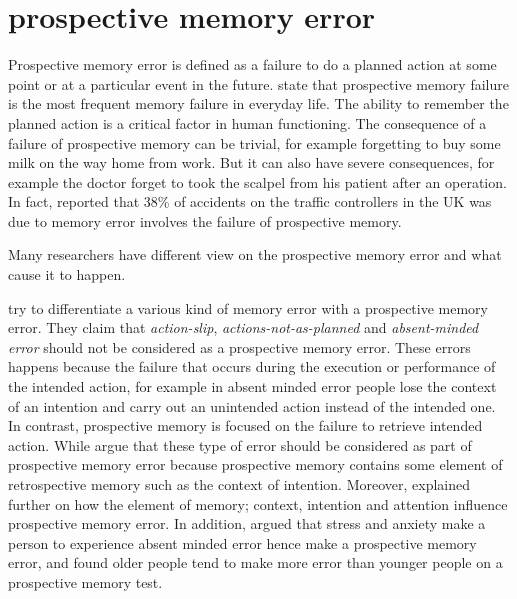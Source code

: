\section{prospective memory error}

Prospective memory error is defined as a failure to do a planned action at some point or at a particular event in the future.
\cite{Kliegel1984} state that prospective memory failure is the most frequent memory failure in everyday life.
The ability to remember the planned action is a critical factor in human functioning. The consequence of a failure of prospective memory can be trivial, for example forgetting to buy some milk on the way home from work.
But it can also have severe consequences, for example the doctor forget to took the scalpel from his patient after an operation.
In fact, \cite{Shorrock2005} reported that 38\% of accidents on the traffic controllers in the UK was due to memory error involves the failure of prospective memory.

Many researchers have different view on the prospective memory error and what cause it to happen.

\cite{LiaKvavilashviliAndJudiEllis} try to differentiate a various kind of memory error with a prospective memory error. They claim that \textit{action-slip}\citep{HeckhausenHeinz1990IAaA},
 \textit{actions-not-as-planned} \citep{Reason1979-REAANA-2} and \textit{absent-minded error} \citep{cohen2008memory} should not be considered as a prospective memory error. These errors happens because the failure that occurs during the execution or performance of the intended action, for example in absent minded error people lose the context of an intention and carry out an unintended action instead of the intended one. In contrast, prospective memory is focused on the failure to retrieve intended action.
While \cite{10.1371/journal.pone.0074447} argue that these type of error should be considered as part of prospective memory error because prospective memory contains some element of retrospective memory such as the context of intention. Moreover, \cite{Reason1984} explained further on how the element of memory; context, intention and attention influence prospective memory error.  In addition, \cite{Cockburn1994} argued that stress and anxiety make a person to experience absent minded error hence make a
prospective memory error, and \cite{Scullin2012} found older people tend to make more error than younger people on a prospective memory test.

